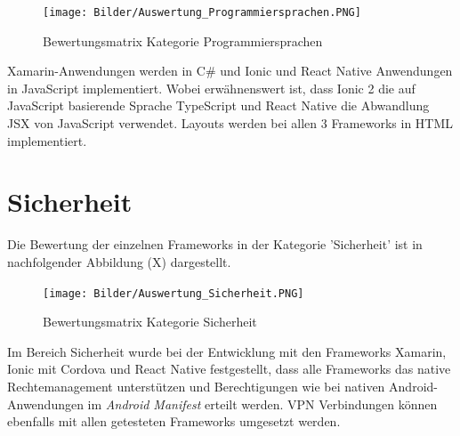 \begin{figure}[h]
	\centering
	\texttt{[image: Bilder/Auswertung\_Programmiersprachen.PNG]}
	\caption{Bewertungsmatrix Kategorie Programmiersprachen}
	\label{fig:AuswProgr}
\end{figure}

Xamarin-Anwendungen werden in C\# und Ionic und React Native Anwendungen in JavaScript implementiert. Wobei erwähnenswert ist, dass Ionic 2 die auf JavaScript basierende Sprache TypeScript und React Native die Abwandlung JSX von JavaScript verwendet. Layouts werden bei allen 3 Frameworks in HTML implementiert.  

\section{Sicherheit}

Die Bewertung der einzelnen Frameworks in der Kategorie 'Sicherheit' ist in nachfolgender Abbildung (X) dargestellt.

\begin{figure}[h]
	\centering
	\texttt{[image: Bilder/Auswertung\_Sicherheit.PNG]}
	\caption{Bewertungsmatrix Kategorie Sicherheit}
	\label{fig:AuswSicherheit}
\end{figure}

Im Bereich Sicherheit wurde bei der Entwicklung mit den Frameworks Xamarin, Ionic mit Cordova und React Native festgestellt, dass alle Frameworks das native Rechtemanagement unterstützen und Berechtigungen wie bei nativen Android-Anwendungen im \textit{Android Manifest} erteilt werden. VPN Verbindungen können ebenfalls mit allen getesteten Frameworks umgesetzt werden. 